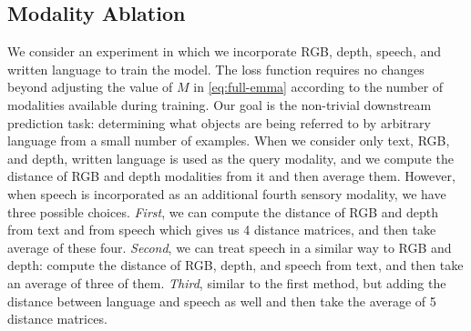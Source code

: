 \documentclass[10pt]{article} %
\newcommand{\todokdinline}[1]{\todo[color=red!20,inline]{{KD: \small #1}}}
\begin{document}
\subsection{Modality Ablation}
We consider an experiment in which we incorporate RGB, depth, speech, and written language to train the model. The loss function requires no changes beyond adjusting the value of $M$ in \cref{eq:full-emma} according to the number of modalities available during training. Our goal is the non-trivial downstream prediction task: determining what objects are being referred to by arbitrary language from a small number of examples. When we consider only text, RGB, and depth, written language is used as the query modality, and we compute the distance of RGB and depth modalities from it and then average them. However, when speech is incorporated as an additional fourth sensory modality, we have three possible choices. \textit{First}, we can compute the distance of RGB and depth from text and from speech which gives us 4 distance matrices, and then take average of these four. \textit{Second}, we can treat speech in a similar way to RGB and depth: compute the distance of RGB, depth, and speech from text, and then take an average of three of them. \textit{Third}, similar to the first method, but adding the distance between language and speech as well and then take the average of 5 distance matrices.
\end{document}
